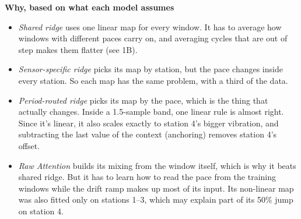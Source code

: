\documentclass[10pt]{article}
\begin{document}
\textbf{Why, based on what each model assumes}
\begin{itemize}
\item \emph{Shared ridge} uses one linear map for every window. It has to average how windows with different paces carry on, and averaging cycles that are out of step makes them flatter (see 1B).
\item \emph{Sensor-specific ridge} picks its map by station, but the pace changes inside every station. So each map has the same problem, with a third of the data.
\item \emph{Period-routed ridge} picks its map by the pace, which is the thing that actually changes. Inside a 1.5-sample band, one linear rule is almost right. Since it's linear, it also scales exactly to station 4's bigger vibration, and subtracting the last value of the context (anchoring) removes station 4's offset.
\item \emph{Raw Attention} builds its mixing from the window itself, which is why it beats shared ridge. But it has to learn how to read the pace from the training windows while the drift ramp makes up most of its input. Its non-linear map was also fitted only on stations 1--3, which may explain part of its 50\% jump on station 4.
\end{itemize}
\end{document}

